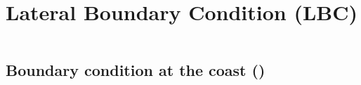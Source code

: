 \documentclass[../tex_main/NEMO_manual]{subfiles}
\begin{document}
\chapter{Lateral Boundary Condition (LBC)}
\label{chap:LBC}
\minitoc

\newpage
$\ $\newline    %



\section{Boundary condition at the coast (\protect{})}
\label{sec:LBC_coast}



\end{document}

